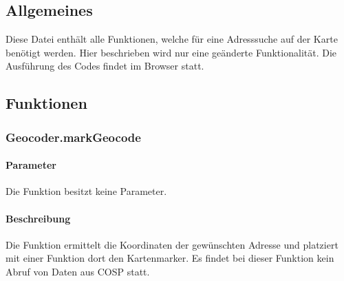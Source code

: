 \subsection{Allgemeines} Diese Datei enthält alle Funktionen, welche für eine Adresssuche auf der Karte benötigt werden. Hier beschrieben wird nur eine geänderte Funktionalität.
Die Ausführung des Codes findet im Browser statt.
\subsection{Funktionen}
\subsubsection{Geocoder.markGeocode}
\paragraph{Parameter} Die Funktion besitzt keine Parameter.
\paragraph{Beschreibung} Die Funktion ermittelt die Koordinaten der gewünschten Adresse und platziert mit einer Funktion dort den Kartenmarker. Es findet bei dieser Funktion kein Abruf von Daten aus {\glqq COSP\grqq} statt.
